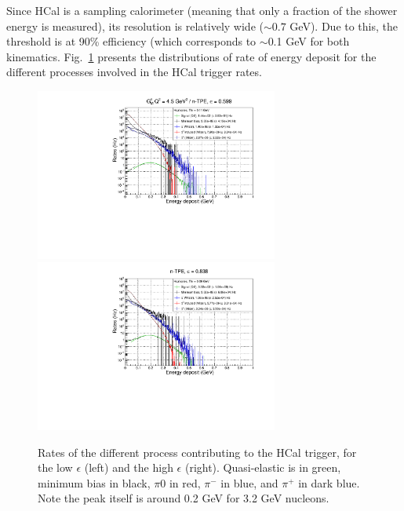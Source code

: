 Since HCal is a sampling calorimeter (meaning that only a fraction of the shower energy is measured), its resolution is relatively wide ($\sim0.7$ GeV).
Due to this, the threshold is at 90\% efficiency (which corresponds to $\sim$0.1 GeV for both kinematics.
Fig.~\ref{fig:HCalRates} presents the distributions of rate of energy deposit for the different processes involved in the HCal trigger rates.
\begin{figure}[h]
  \centering
    \includegraphics[width=8cm]{Plots/HCalRates_gen-tpe_le.pdf}
    \includegraphics[width=8cm]{Plots/HCalRates_gen-tpe_he.pdf}
    \caption{Rates of the different process contributing to the HCal trigger, for the low $\epsilon$ (left) and the high $\epsilon$ (right). Quasi-elastic is in green, minimum bias in black, $\pi0$ in red, $\pi^-$ in blue, and $\pi^+$ in dark blue. Note the peak itself is around 0.2 GeV for 3.2 GeV nucleons.}
    \label{fig:HCalRates}
\end{figure}

